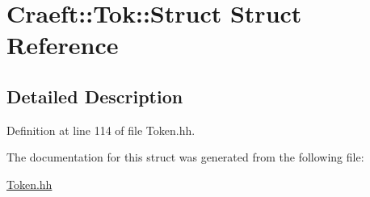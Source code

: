 \hypertarget{struct_craeft_1_1_tok_1_1_struct}{}\section{Craeft\+:\+:Tok\+:\+:Struct Struct Reference}
\label{struct_craeft_1_1_tok_1_1_struct}


\subsection{Detailed Description}


Definition at line 114 of file Token.\+hh.



The documentation for this struct was generated from the following file\+:\begin{DoxyCompactItemize}
\item 
\hyperlink{_token_8hh}{Token.\+hh}\end{DoxyCompactItemize}
